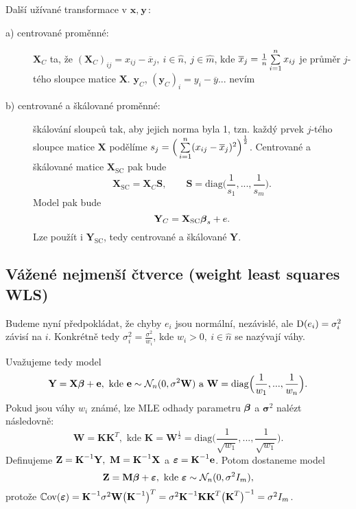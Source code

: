\begin{remark}
	Další užívané transformace v $\textbf{x},~\textbf{y}$:\begin{description}
	\item[a) centrované proměnné:] $\textbf{X}_C$ ta, že $(\textbf{X}_C)_{ij}=x_{ij}-\overline{x}_j,~i\in\hat{n},~j\in\hat{m}$, kde $\overline{x}_j=\frac{1}{n}\sum\limits_{i=1}^{n} x_{ij}$ je průměr $j$-tého sloupce matice $\textbf{X}$. $\textbf{y}_C$, $(\textbf{y}_C)_i=y_i-\overline{y}$... nevím
	\item[b) centrované a škálované proměnné:] škálování sloupců tak, aby jejich norma byla 1, tzn. každý prvek $j$-tého sloupce matice $\textbf{X}$ podělíme $s_j=\Big(\sum\limits_{i=1}^{n}(x_{ij}-\overline{x}_j)^2\Big)^{\frac{1}{2}}$. Centrované a škálované matice $\textbf{X}_\mathrm{SC}$ pak bude 
	$$ \textbf{X}_\mathrm{SC}=\textbf{X}_C\textbf{S},\qquad \textbf{S}=\mathrm{diag}\Big(\frac{1}{s_1},...,\frac{1}{s_m}\Big).$$ Model pak bude 
	$$ \textbf{Y}_C=\textbf{X}_\mathrm{SC}\boldsymbol{\beta}_s+e.$$ Lze použít i $\textbf{Y}_\mathrm{SC}$, tedy centrované a škálované $\textbf{Y}$.
	\end{description}
\end{remark}
\subsection*{Vážené nejmenší čtverce (weight least squares WLS)}
Budeme nyní předpokládat, že chyby $e_i$ jsou normální, nezávislé, ale $\mathrm{D}(e_i)=\sigma_i^2$ závisí na $i$. Konkrétně tedy $\sigma_i^2=\frac{\sigma^2}{w_i}$, kde $w_i>0,~i\in\hat{n}$ se nazývají váhy.

Uvažujeme tedy model 
\begin{equation}\label{rovnickaW}
\textbf{Y}=\textbf{X}\boldsymbol{\beta}+\textbf{e},\text{ kde }\textbf{e}\sim\mathcal{N}_n(0,\sigma^2\textbf{W})\text{ a }\textbf{W}=\mathrm{diag}\Big(\frac{1}{w_1},...,\frac{1}{w_n}\Big).
\end{equation}
Pokud jsou váhy $w_i$ známé, lze MLE odhady parametru $\boldsymbol{\beta}$ a $\boldsymbol{\sigma}^2$ nalézt následovně:
$$ \textbf{W}=\textbf{K} \textbf{K}^T,\text{ kde }\textbf{K}=\textbf{W}^{\frac{1}{2}}=\mathrm{diag}\Big(\frac{1}{\sqrt{w_1}},...,\frac{1}{\sqrt{w_1}}\Big).$$
Definujeme $\textbf{Z}={\textbf{K}^{-1}}\textbf{Y},~\textbf{M}={\textbf{K}^{-1}}\textbf{X}$ a $\boldsymbol{\varepsilon}={\textbf{K}^{-1}}\textbf{e}$. Potom dostaneme model 
\begin{equation}\label{rovnickaW2}
\textbf{Z}=\textbf{M}\boldsymbol{\beta}+\boldsymbol{\varepsilon},\text{ kde }\boldsymbol{\varepsilon}\sim\mathcal{N}_n(0,\sigma^2 I_m),
\end{equation}
protože $\mathbb{C}\mathrm{ov}(\boldsymbol{\varepsilon})={\textbf{K}^{-1}}\sigma^2\textbf{W}\big({\textbf{K}^{-1}}\big)^T=\sigma^2 {\textbf{K}^{-1}}\textbf{K}\textbf{K}^T\big(\textbf{K}^T\big)^{-1}=\sigma^2 I_m$.

